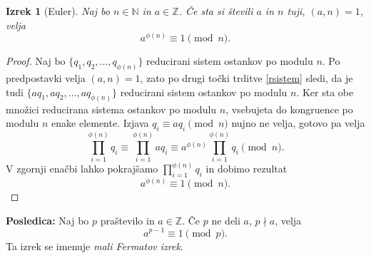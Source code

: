 \documentclass[12pt, a4paper]{article}
\newtheorem{izr}{Izrek}
\newenvironment{posl}[1][]{\par\medskip\noindent \textbf{Posledica: }}{\medskip}
\begin{document}
\begin{izr}[Euler]
Naj bo $n\in \mathbb{N}$ in $a\in \mathbb{Z}$. Če sta si števili $a$ in $n$ tuji, $(a,n)=1$, velja
$$a^{\phi(n)}\equiv 1 \pmod n.$$
\end{izr}

\begin{proof}
Naj bo $\{q_{1},q_{2},\dots,q_{\phi(n)}\}$ reducirani sistem ostankov po modulu $n$. Po predpostavki velja $(a,n)=1$, zato po drugi točki trditve \ref{rsistem} sledi, da je tudi $\{aq_{1},aq_{2},\dots,aq_{\phi(n)}\}$ reducirani sistem ostankov po modulu $n$. Ker sta obe množici reducirana sistema ostankov po modulu $n$, vsebujeta do kongruence po modulu $n$ enake elemente. Izjava $q_{i}\equiv aq_{i} \pmod n$ nujno ne velja, gotovo pa velja
$$\prod_{i=1}^{\phi(n)}q_{i} \equiv \prod_{i=1}^{\phi(n)}aq_{i} \equiv a^{\phi(n)}\prod_{i=1}^{\phi(n)}q_{i} \pmod n.$$
V zgornji enačbi lahko pokrajšamo $\prod_{i=1}^{\phi(n)}q_{i}$ in dobimo rezultat
$$a^{\phi(n)}\equiv 1 \pmod n.$$
\end{proof}

\begin{posl}
Naj bo $p$ praštevilo in $a\in \mathbb{Z}$. Če $p$ ne deli $a$, $p\nmid a$, velja
$$a^{p-1}\equiv 1 \pmod p.$$
Ta izrek se imenuje \textit{mali Fermatov izrek}.
\end{posl}
\end{document}
